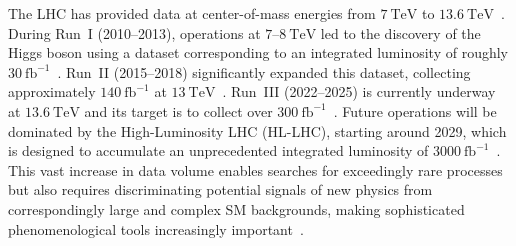 The LHC has provided data at center-of-mass energies from $7~\mathrm{TeV}$ to $13.6~\mathrm{TeV}$~\cite{CMS:2021ctt,lumiRef}. During Run~I (2010–2013), operations at $7$–$8~\mathrm{TeV}$ led to the discovery of the Higgs boson using a dataset corresponding to an integrated luminosity of roughly $30~\mathrm{fb}^{-1}$~\cite{ATLAS:2012yve,CMS:2012gu}. Run~II (2015–2018) significantly expanded this dataset, collecting approximately $140~\mathrm{fb}^{-1}$ at $13~\mathrm{TeV}$~\cite{lumiRef,CMS:2021ctt}. Run~III (2022–2025) is currently underway at $13.6~\mathrm{TeV}$ and its target is to collect over $300~\mathrm{fb}^{-1}$~\cite{lumiRef}. Future operations will be dominated by the High-Luminosity LHC (HL-LHC), starting around 2029, which is designed to accumulate an unprecedented integrated luminosity of $3000~\mathrm{fb}^{-1}$~\cite{CMS-PAS-FTR-13-014,Apollinari2017_HLLHC}. This vast increase in data volume enables searches for exceedingly rare processes but also requires discriminating potential signals of new physics from correspondingly large and complex SM backgrounds, making sophisticated phenomenological tools increasingly important~\cite{Alwall:2014hca,deFavereau:2013fsa}.


 
 
 
 
 
